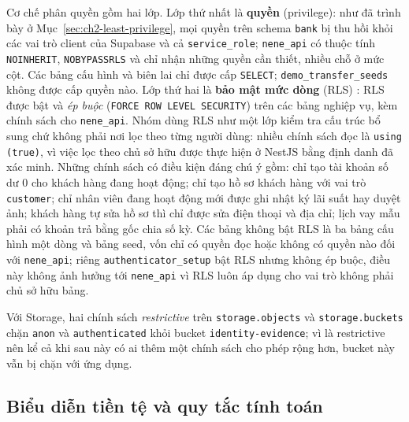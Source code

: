 Cơ chế phân quyền gồm hai lớp. Lớp thứ nhất là \textbf{quyền} (privilege): như đã trình bày ở Mục~\ref{sec:ch2-least-privilege}, mọi quyền trên schema \texttt{bank} bị thu hồi khỏi các vai trò client của Supabase và cả \texttt{service\_\allowbreak{}role}; \texttt{nene\_\allowbreak{}api} có thuộc tính \texttt{NOINHERIT}, \texttt{NOBYPASSRLS} và chỉ nhận những quyền cần thiết, nhiều chỗ ở mức cột. Các bảng cấu hình và biên lai chỉ được cấp \texttt{SELECT}; \texttt{demo\_\allowbreak{}transfer\_\allowbreak{}seeds} không được cấp quyền nào. Lớp thứ hai là \textbf{bảo mật mức dòng} (RLS) \parencite{ch2-pg-rls,ch2-supabase-rls}: RLS được bật và \emph{ép buộc} (\texttt{FORCE ROW LEVEL SECURITY}) trên các bảng nghiệp vụ, kèm chính sách cho \texttt{nene\_\allowbreak{}api}. Nhóm dùng RLS như một lớp kiểm tra cấu trúc bổ sung chứ không phải nơi lọc theo từng người dùng: nhiều chính sách đọc là \texttt{using (true)}, vì việc lọc theo chủ sở hữu được thực hiện ở NestJS bằng định danh đã xác minh. Những chính sách có điều kiện đáng chú ý gồm: chỉ tạo tài khoản số dư 0 cho khách hàng đang hoạt động; chỉ tạo hồ sơ khách hàng với vai trò \texttt{customer}; chỉ nhân viên đang hoạt động mới được ghi nhật ký lãi suất hay duyệt ảnh; khách hàng tự sửa hồ sơ thì chỉ được sửa điện thoại và địa chỉ; lịch vay mẫu phải có khoản trả bằng gốc chia số kỳ. Các bảng không bật RLS là ba bảng cấu hình một dòng và bảng seed, vốn chỉ có quyền đọc hoặc không có quyền nào đối với \texttt{nene\_\allowbreak{}api}; riêng \texttt{authenticator\_\allowbreak{}setup} bật RLS nhưng không ép buộc, điều này không ảnh hưởng tới \texttt{nene\_\allowbreak{}api} vì RLS luôn áp dụng cho vai trò không phải chủ sở hữu bảng.

Với Storage, hai chính sách \emph{restrictive} trên \texttt{storage.\allowbreak{}objects} và \texttt{storage.\allowbreak{}buckets} chặn \texttt{anon} và \texttt{authenticated} khỏi bucket \texttt{identity-\allowbreak{}evidence}; vì là restrictive nên kể cả khi sau này có ai thêm một chính sách cho phép rộng hơn, bucket này vẫn bị chặn với ứng dụng.

\subsection{Biểu diễn tiền tệ và quy tắc tính toán}
\label{sec:ch2-money}

